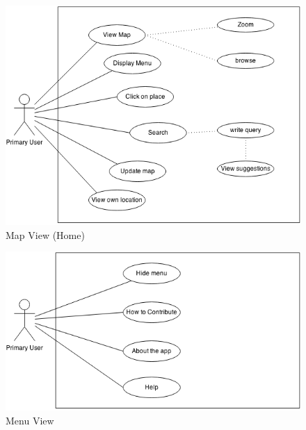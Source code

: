 \begin{figure}[!h]
\begin{center}
\includegraphics[scale=0.6]{ms.png}
\caption{Map View (Home)}
\end{center}
\end{figure}

\begin{figure}[!h]
\begin{center}
\includegraphics[scale=0.6]{mens.png}
\caption{Menu View}
\end{center}
\end{figure}


